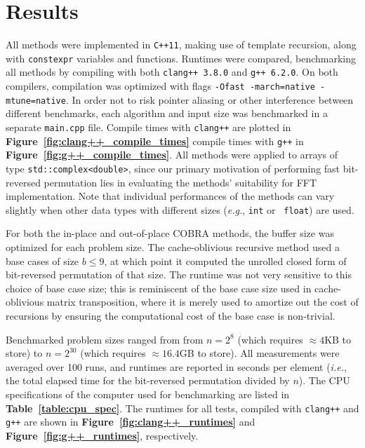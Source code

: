 \documentclass[10pt]{article}
\begin{document}
\section*{Results}
All methods were implemented in {\tt C++11}, making use of template
recursion, along with {\tt constexpr} variables and
functions. Runtimes were compared, benchmarking all methods by
compiling with both {\tt clang++ 3.8.0} and {\tt g++ 6.2.0}. On both
compilers, compilation was optimized with flags {\tt -Ofast
  -march=native -mtune=native}. In order not to risk pointer aliasing
or other interference between different benchmarks, each algorithm and
input size was benchmarked in a separate {\tt main.cpp} file.  Compile
times with {\tt clang++} are plotted in {\bf
  Figure~\ref{fig:clang++_compile_times}} compile times with {\tt g++}
in {\bf Figure~\ref{fig:g++_compile_times}}. All methods were applied
to arrays of type {\tt std::complex<double>}, since our primary
motivation of performing fast bit-reversed permutation lies in
evaluating the methods' suitability for FFT implementation. Note that
individual performances of the methods can vary slightly when other
data types with different sizes (\emph{e.g.}, {\tt int} or {\tt
  float}) are used.

For both the in-place and out-of-place COBRA methods, the buffer size
was optimized for each problem size. The cache-oblivious recursive
method used a base cases of size $b \leq 9$, at which point it
computed the unrolled closed form of bit-reversed permutation of that
size. The runtime was not very sensitive to this choice of base case
size; this is reminiscent of the base case size used in
cache-oblivious matrix transposition, where it is merely used to
amortize out the cost of recursions by ensuring the computational cost
of the base case is non-trivial. 

Benchmarked problem sizes ranged from from $n = 2^8$ (which requires
$\approx 4$KB to store) to $n = 2^{30}$ (which requires $\approx
16.4$GB to store). All measurements were averaged over 100 runs, and
runtimes are reported in seconds per element (\emph{i.e.}, the total
elapsed time for the bit-reversed permutation divided by $n$). The CPU
specifications of the computer used for benchmarking are listed in
{\bf Table~\ref{table:cpu_spec}}. The runtimes for all tests, compiled
with {\tt clang++} and {\tt g++} are shown in {\bf
  Figure~\ref{fig:clang++_runtimes}} and {\bf
  Figure~\ref{fig:g++_runtimes}}, respectively.
\end{document}
